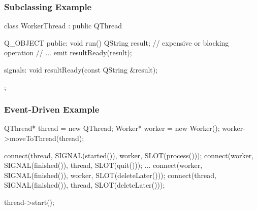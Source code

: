 
\begin{slide}[fragile]
\frametitle{Subclassing Example}

\begin{cpp}
class WorkerThread : public QThread
{
    Q_OBJECT
public:
    void run() {
        QString result;
        // expensive or blocking operation
        // ...
        emit resultReady(result);
    }
    
signals:
    void resultReady(const QString &result);
};\end{cpp}

\vspace{1em}

\end{slide}


\begin{slide}[fragile]
\frametitle{Event-Driven Example}

\begin{cpp}
QThread* thread = new QThread;
Worker* worker = new Worker();
worker->moveToThread(thread);

connect(thread, SIGNAL(started()),  worker, SLOT(process()));
connect(worker, SIGNAL(finished()), thread, SLOT(quit()));
...
connect(worker, SIGNAL(finished()), worker, SLOT(deleteLater()));
connect(thread, SIGNAL(finished()), thread, SLOT(deleteLater()));
        
thread->start();
\end{cpp}

\vspace{1em}

\end{slide}


